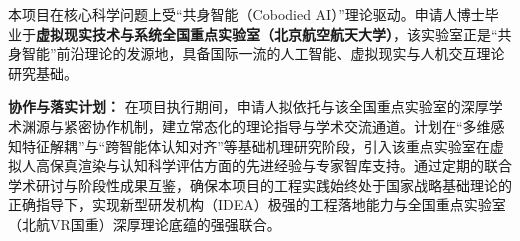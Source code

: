 本项目在核心科学问题上受“共身智能（Cobodied AI）”理论驱动。申请人博士毕业于\textbf{虚拟现实技术与系统全国重点实验室（北京航空航天大学）}，该实验室正是“共身智能”前沿理论的发源地，具备国际一流的人工智能、虚拟现实与人机交互理论研究基础。

\textbf{协作与落实计划：} 
在项目执行期间，申请人拟依托与该全国重点实验室的深厚学术渊源与紧密协作机制，建立常态化的理论指导与学术交流通道。计划在“多维感知特征解耦”与“跨智能体认知对齐”等基础机理研究阶段，引入该重点实验室在虚拟人高保真渲染与认知科学评估方面的先进经验与专家智库支持。通过定期的联合学术研讨与阶段性成果互鉴，确保本项目的工程实践始终处于国家战略基础理论的正确指导下，实现新型研发机构（IDEA）极强的工程落地能力与全国重点实验室（北航VR国重）深厚理论底蕴的强强联合。